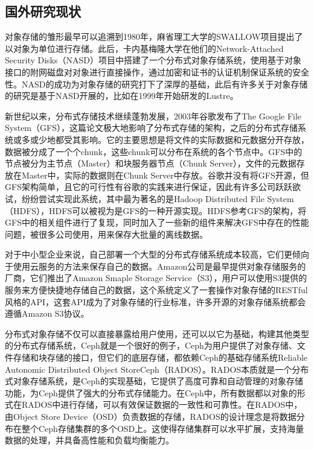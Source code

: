 \subsection{国外研究现状}%
对象存储的雏形最早可以追溯到1980年，麻省理工大学的SWALLOW项目提出了以对象为单位进行存储\cite{10}。此后，卡内基梅隆大学在他们的Network-Attached Security Disks\cite{11}（NASD）项目中搭建了一个分布式对象存储系统，使用基于对象接口的附网磁盘对对象进行直接操作，通过加密和证书的认证机制保证系统的安全性。NASD的成功为对象存储的研究打下了深厚的基础，此后有许多关于对象存储的研究是基于NASD开展的，比如在1999年开始研发的Lustre\cite{12}。

新世纪以来，分布式存储技术继续蓬勃发展，2003年谷歌发布了The Google File System\cite{13}（GFS），这篇论文极大地影响了分布式存储的架构，之后的分布式存储系统或多或少地都受其影响。它的主要思想是将文件的实际数据和元数据分开存放，数据被分成了一个个chunk，这些chunk可以分布在系统的各个节点中。GFS中的节点被分为主节点（Master）和块服务器节点（Chunk Server），文件的元数据存放在Master中，实际的数据则在Chunk Server中存放。谷歌并没有将GFS开源，但GFS架构简单，且它的可行性有谷歌的实践来进行保证，因此有许多公司跃跃欲试，纷纷尝试实现此系统，其中最为著名的是Hadoop Distributed File System\cite{14}（HDFS），HDFS可以被视为是GFS的一种开源实现。HDFS参考GFS的架构，将GFS中的相关组件进行了复现，同时加入了一些新的组件来解决GFS中存在的性能问题，被很多公司使用，用来保存大批量的离线数据。

对于中小型企业来说，自己部署一个大型的分布式存储系统成本较高，它们更倾向于使用云服务的方法来保存自己的数据。Amazon公司是最早提供对象存储服务的厂商，它们推出了Amazon Smaple Storage Service\cite{15}（S3），用户可以使用S3提供的服务来方便快捷地存储自己的数据，这个系统定义了一套操作对象存储的RESTful风格的API\cite{16}，这套API成为了对象存储的行业标准，许多开源的对象存储系统都会遵循Amazon S3协议。

分布式对象存储不仅可以直接暴露给用户使用，还可以以它为基础，构建其他类型的分布式存储系统，Ceph\cite{17,18}就是一个很好的例子，Ceph为用户提供了对象存储、文件存储和块存储的接口，但它们的底层存储，都依赖Ceph的基础存储系统Reliable Autonomic Distributed Object StoreCeph\cite{19,20}（RADOS）。RADOS本质就是一个分布式对象存储系统，是Ceph的实现基础，它提供了高度可靠和自动管理的对象存储功能，为Ceph提供了强大的分布式存储能力。在Ceph中，所有数据都以对象的形式在RADOS中进行存储，可以有效保证数据的一致性和可靠性。在RADOS中，由Object Store Device（OSD）负责数据的存储，RADOS的设计理念是将数据分布在整个Ceph存储集群的多个OSD上。这使得存储集群可以水平扩展，支持海量数据的处理，并具备高性能和负载均衡能力。

